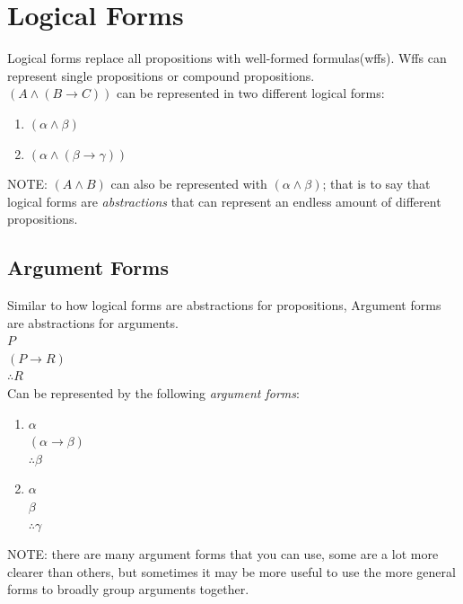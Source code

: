 \documentclass[]{article}
\begin{document}
\section{Logical Forms}
Logical forms replace all propositions with well-formed formulas(wffs). Wffs can represent single propositions or compound propositions.\vspace{5pt}\\
$(A \wedge (B \rightarrow C))$ can be represented in two different logical forms:
\begin{enumerate}
	\item $(\alpha \wedge \beta)$
	\item $(\alpha \wedge (\beta \rightarrow \gamma))$
\end{enumerate}
NOTE: $(A \wedge B)$ can also be represented with $(\alpha \wedge \beta)$; that is to say that logical forms are \textit{abstractions} that can represent an endless amount of different propositions.
\subsection{Argument Forms}
Similar to how logical forms are abstractions for propositions, Argument forms are abstractions for arguments.\\
$P$\\
$(P \rightarrow R)$\\
$\therefore R$\\
Can be represented by the following \textit{argument forms}:
\begin{enumerate}
 \item{$\alpha$\\$(\alpha \rightarrow \beta)$\\$\therefore \beta$}
 \item{$\alpha$\\$\beta$\\$\therefore \gamma$}
\end{enumerate}
NOTE: there are many argument forms that you can use, some are a lot more clearer than others, but sometimes it may be more useful to use the more general forms to broadly group arguments together.
\end{document}
